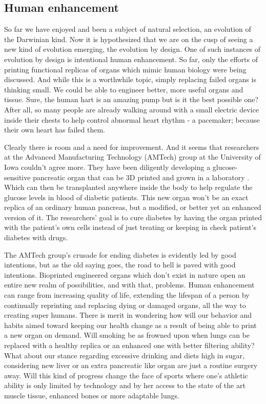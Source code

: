 \documentclass[12pt]{article} %
\begin{document}

\subsection{Human enhancement} %

So far we have enjoyed and been a subject of natural selection, an evolution of the Darwinian kind. Now it is hypothesized that we are on the cusp of seeing a new kind of evolution emerging, the evolution by design. One of such instances of evolution by design is intentional human enhancement. So far, only the efforts of printing functional replicas of organs which mimic human biology were being discussed. And while this is a worthwhile topic, simply replacing failed organs is thinking small. We could be able to engineer better, more useful organs and tissue. Sure, the human hart is an amazing pump but is it the best possible one?  After all, so many people \cite{Wood:2002} are already walking around with a small electric device inside their chests to help control abnormal heart rhythm - a pacemaker; because their own heart has failed them.

Clearly there is room and a need for improvement. And it seems that researchers at the Advanced Manufacturing Technology (AMTech) group at the University of Iowa couldn't agree more. They have been diligently developing a glucose-sensitive pancreatic organ that can be 3D printed and grown in a laboratory \cite{Ozbolat:2013}. Which can then be transplanted anywhere inside the body to help regulate the glucose levels in blood of diabetic patients. This new organ won't be an exact replica of an ordinary human pancreas, but a modified, or better yet an enhanced version of it. The researchers' goal is to cure diabetes by having the organ printed with the patient's own cells instead of just treating or keeping in check patient's diabetes with drugs.

The AMTech group's crusade for ending diabetes is evidently led by good intentions, but as the old saying goes, the road to hell is paved with good intentions. Bioprinted engineered organs which don't exist in nature open an entire new realm of possibilities, and with that, problems. 
Human enhancement can range from increasing quality of life, extending the lifespan of a person by continually reprinting and replacing dying or damaged organs, all the way to creating super humans. There is merit in wondering how will our behavior and habits aimed toward keeping our health change as a result of being able to print a new organ on demand. Will smoking be as frowned upon when lungs can be replaced with a healthy replica or an enhanced one with better filtering ability? What about our stance regarding excessive drinking and diets high in sugar, considering new liver or an extra pancreatic like organ are just a routine surgery away. Will this kind of progress change the face of sports where one's athletic ability is only limited by technology and by her access to the state of the art muscle tissue, enhanced bones or more adaptable lungs.
\end{document}
